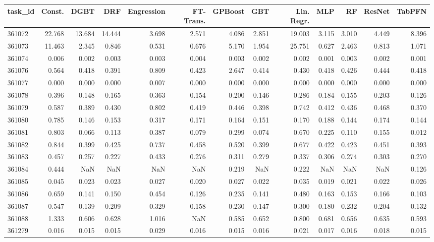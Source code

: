 \begin{tabular}{lrrrrrrrrrrrr}
\toprule
task\_id & Const. & DGBT & DRF & Engression & FT-Trans. & GPBoost & GBT & Lin. Regr. & MLP & RF & ResNet & TabPFN \\
\midrule
361072 & 22.768 & 13.684 & 14.444 & 3.698 & 2.571 & 4.086 & 2.851 & 19.003 & 3.115 & 3.010 & 4.449 & 8.396 \\
361073 & 11.463 & 2.345 & 0.846 & 0.531 & 0.676 & 5.170 & 1.954 & 25.751 & 0.627 & 2.463 & 0.813 & 1.071 \\
361074 & 0.006 & 0.002 & 0.003 & 0.003 & 0.004 & 0.003 & 0.002 & 0.002 & 0.001 & 0.003 & 0.002 & 0.001 \\
361076 & 0.564 & 0.418 & 0.391 & 0.809 & 0.423 & 2.647 & 0.414 & 0.430 & 0.418 & 0.426 & 0.444 & 0.418 \\
361077 & 0.000 & 0.000 & 0.000 & 0.007 & 0.000 & 0.000 & 0.000 & 0.000 & 0.000 & 0.000 & 0.000 & 0.000 \\
361078 & 0.396 & 0.148 & 0.165 & 0.363 & 0.154 & 0.200 & 0.146 & 0.286 & 0.184 & 0.155 & 0.203 & 0.126 \\
361079 & 0.587 & 0.389 & 0.430 & 0.802 & 0.419 & 0.446 & 0.398 & 0.742 & 0.412 & 0.436 & 0.468 & 0.370 \\
361080 & 0.785 & 0.146 & 0.153 & 0.317 & 0.171 & 0.164 & 0.151 & 0.170 & 0.188 & 0.144 & 0.174 & 0.144 \\
361081 & 0.803 & 0.066 & 0.113 & 0.387 & 0.079 & 0.299 & 0.074 & 0.670 & 0.225 & 0.110 & 0.155 & 0.012 \\
361082 & 0.844 & 0.399 & 0.425 & 0.737 & 0.458 & 0.520 & 0.399 & 0.677 & 0.422 & 0.423 & 0.451 & 0.393 \\
361083 & 0.457 & 0.257 & 0.227 & 0.433 & 0.276 & 0.311 & 0.279 & 0.337 & 0.306 & 0.274 & 0.303 & 0.270 \\
361084 & 0.444 & NaN & NaN & NaN & NaN & 0.219 & NaN & 0.222 & NaN & NaN & NaN & 0.126 \\
361085 & 0.045 & 0.023 & 0.023 & 0.027 & 0.020 & 0.027 & 0.022 & 0.035 & 0.019 & 0.021 & 0.022 & 0.026 \\
361086 & 0.659 & 0.141 & 0.150 & 0.454 & 0.126 & 0.235 & 0.141 & 0.480 & 0.163 & 0.153 & 0.166 & 0.103 \\
361087 & 0.547 & 0.139 & 0.209 & 0.329 & 0.158 & 0.230 & 0.147 & 0.300 & 0.180 & 0.232 & 0.204 & 0.132 \\
361088 & 1.333 & 0.606 & 0.628 & 1.016 & NaN & 0.585 & 0.652 & 0.800 & 0.681 & 0.656 & 0.635 & 0.593 \\
361279 & 0.016 & 0.015 & 0.015 & 0.029 & 0.016 & 0.015 & 0.016 & 0.021 & 0.017 & 0.016 & 0.018 & 0.015 \\

\end{tabular}
